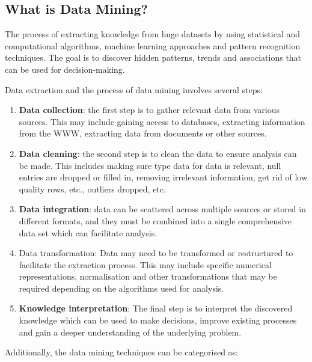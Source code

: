 \documentclass[a4paper, 12pt]{article}
\theoremstyle{plain}
\theoremstyle{definition}
\newtheorem{defn}{Definition}[section]
\theoremstyle{remark}
\begin{document}
\subsection{What is Data Mining?}
\begin{tcolorbox}[colback=black!3!white,colframe=black!60!white,title=\begin{defn}Data Mining \label{Data Mining}\end{defn}]
The process of extracting knowledge from huge datasets by using statistical and computational algorithms, machine learning approaches and pattern recognition techniques. The goal is to discover hidden patterns, trends and associations that can be used for decision-making.
\end{tcolorbox}
\noindent Data extraction and the process of data mining involves several steps:
\begin{enumerate}
	\item \textbf{Data collection}: the first step is to gather relevant data from various sources. This may include gaining access to databases, extracting information from the WWW, extracting data from documents or other sources.
	\item \textbf{Data cleaning}: the second step is to clean the data to ensure analysis can be made. This includes making sure type data for data is relevant, null entries are dropped or filled in, removing irrelevant information, get rid of low quality rows, etc., outliers dropped, etc.
	\item \textbf{Data integration}: data can be scattered across multiple sources or stored in different formats, and they must be combined into a single comprehensive data set which can facilitate analysis.
	\item Data transformation: Data may need to be transformed or restructured to facilitate the extraction process. This may include specific numerical representations, normalisation and other transformations that may be required depending on the algorithms used for analysis.
	\item \textbf{Knowledge interpretation}: The final step is to interpret the discovered knowledge which can be used to make decisions, improve existing processes and gain a deeper understanding of the underlying problem.
\end{enumerate}
Additionally, the data mining techniques can be categorised as:
\end{document}
